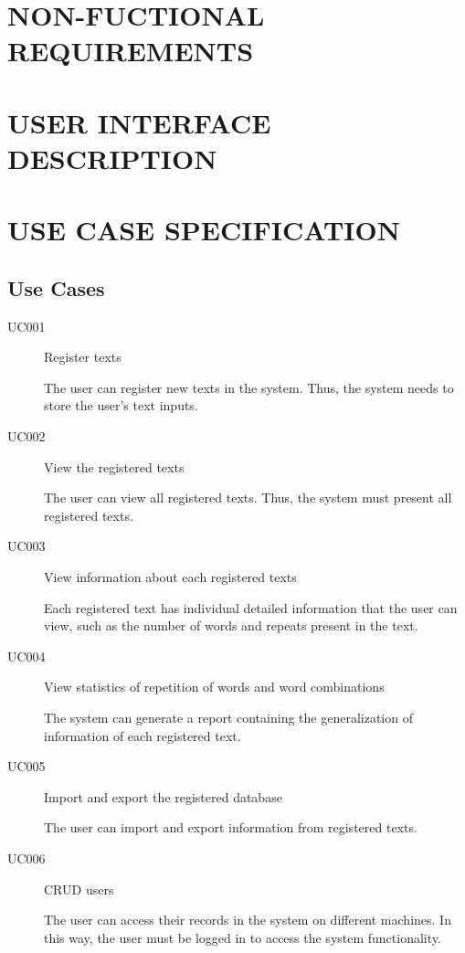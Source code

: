 \documentclass[11pt, twoside, a4paper]{book}
\begin{document}
	\chapter{NON-FUCTIONAL REQUIREMENTS}
	
	\chapter{USER INTERFACE DESCRIPTION}

	\chapter{USE CASE SPECIFICATION}

		\section{Use Cases}
				

			\begin{description}
				\item[UC001] Register texts
					
					The user can register new texts in the system. Thus, the system needs to store the user's text inputs.

				\item[UC002] View the registered texts
					
					The user can view all registered texts. Thus, the system must present all registered texts.

				\item[UC003] View information about each registered texts
					
					Each registered text has individual detailed information that the user can view, such as the number of words and repeats present in the text.
					
				\item[UC004] View statistics of repetition of words and word combinations
					
					The system can generate a report containing the generalization of information of each registered text.
					
				\item[UC005] Import and export the registered database
					
					The user can import and export information from registered texts.
					
				\item[UC006] CRUD users
					
					The user can access their records in the system on different machines. In this way, the user must be logged in to access the system functionality.
					
			\end{description}

			
			
			
			
			
			
			
			
			
			
			
			
			
			
			
			
			
			
			
			
			
\end{document}
